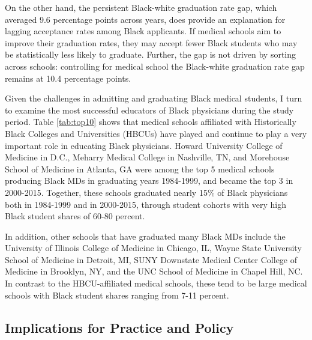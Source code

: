 \documentclass[12pt]{article}
\begin{document}
On the other hand, the persistent Black-white graduation rate gap, which averaged 9.6 percentage points across years, does provide an explanation for lagging acceptance rates among Black applicants. If medical schools aim to improve their graduation rates, they may accept fewer Black students who may be statistically less likely to graduate. Further, the gap is not driven by sorting across schools: controlling for medical school the Black-white graduation rate gap remains at 10.4 percentage points.

Given the challenges in admitting and graduating Black medical students, I turn to examine the most successful educators of Black physicians during the study period. Table \ref{tab:top10} shows that medical schools affiliated with Historically Black Colleges and Universities (HBCUs) have played and continue to play a very important role in educating Black physicians. Howard University College of Medicine in D.C., Meharry Medical College in Nashville, TN, and Morehouse School of Medicine in Atlanta, GA were among the top 5 medical schools producing Black MDs in graduating years 1984-1999, and became the top 3 in 2000-2015. Together, these schools graduated nearly 15\% of Black physicians both in 1984-1999 and in 2000-2015, through student cohorts with very high Black student shares of 60-80 percent. 

In addition, other schools that have graduated many Black MDs include the University of Illinois College of Medicine in Chicago, IL, Wayne State University School of Medicine in Detroit, MI, SUNY Downstate Medical Center College of Medicine in Brooklyn, NY, and the UNC School of Medicine in Chapel Hill, NC. In contrast to the HBCU-affiliated medical schools, these tend to be large medical schools with Black student shares ranging from 7-11 percent.  

\subsection{Implications for Practice and Policy}


\end{document}
